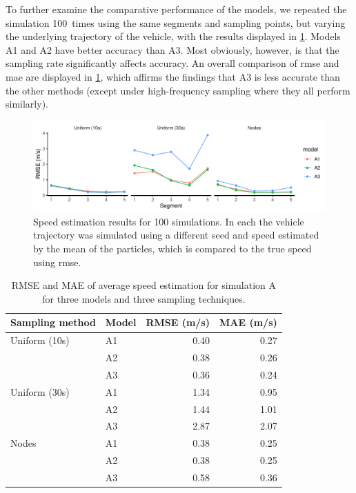 To further examine the comparative performance of the models, we repeated the simulation 100~times using the same segments and sampling points, but varying the underlying trajectory of the vehicle, with the results displayed in \cref{fig:sim1_pf_full}. Models A1 and A2 have better accuracy than A3. Most obviously, however, is that the sampling rate significantly affects accuracy. An overall comparison of \gls{rmse} and \gls{mae} are displayed in \cref{tab:sim1_pf_full}, which affirms the findings that A3 is less accurate than the other methods  (except under high-frequency sampling where they all perform similarly).


\begin{knitrout}\small
{}\color{fgcolor}\begin{figure}
\includegraphics[width=\linewidth]{figure/sim1_pf_full-1} \caption[Results for simulation A replicated 100~times]{Speed estimation results for 100 simulations. In each the vehicle trajectory was simulated using a different seed and speed estimated by the mean of the particles, which is compared to the true speed using \gls{rmse}.}\label{fig:sim1_pf_full}
\end{figure}

\begin{table}

\caption{\label{tab:sim1_pf_full}RMSE and MAE of average speed estimation for simulation A for three models and three sampling techniques.}
\centering
\fontsize{8}{10}\selectfont
\begin{tabular}[t]{llrr}
\toprule
Sampling method & Model & RMSE (m/s) & MAE (m/s)\\
\midrule
Uniform (10s) & A1 & 0.40 & 0.27\\
 & A2 & 0.38 & 0.26\\
 & A3 & 0.36 & 0.24\\
\midrule
Uniform (30s) & A1 & 1.34 & 0.95\\
 & A2 & 1.44 & 1.01\\
 & A3 & 2.87 & 2.07\\
\midrule
Nodes & A1 & 0.38 & 0.25\\
 & A2 & 0.38 & 0.25\\
 & A3 & 0.58 & 0.36\\
\bottomrule
\end{tabular}
\end{table}


\end{knitrout}



